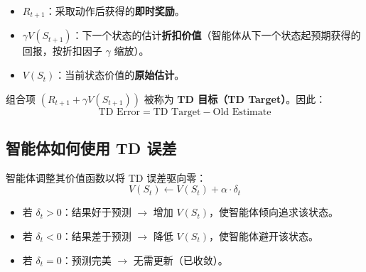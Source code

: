 \begin{itemize}
  \item $R_{t+1}$：采取动作后获得的\textbf{即时奖励}。
  \item $\gamma V(S_{t+1})$：下一个状态的估计\textbf{折扣价值}（智能体从下一个状态起预期获得的回报，按折扣因子 $\gamma$ 缩放）。
  \item $V(S_t)$：当前状态价值的\textbf{原始估计}。
\end{itemize}

组合项 $(R_{t+1} + \gamma V(S_{t+1}))$ 被称为 \textbf{TD 目标（TD Target）}。因此：
\begin{equation}
\text{TD Error} = \text{TD Target} - \text{Old Estimate}
\end{equation}

\subsection{智能体如何使用 TD 误差}
\label{how-the-agent-uses-td-error}

智能体调整其价值函数以将 TD 误差驱向零：
\begin{equation}
\boxed{V(S_t) \leftarrow V(S_t) + \alpha \cdot \delta_t}
\end{equation}

\begin{itemize}
  \item 若 $\delta_t > 0$：结果好于预测 $\rightarrow$ 增加 $V(S_t)$，使智能体倾向追求该状态。
  \item 若 $\delta_t < 0$：结果差于预测 $\rightarrow$ 降低 $V(S_t)$，使智能体避开该状态。
  \item 若 $\delta_t = 0$：预测完美 $\rightarrow$ 无需更新（已收敛）。
\end{itemize}

